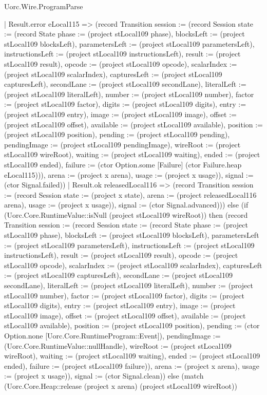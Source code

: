 \begin{lexlean}{Uorc.Wire.ProgramParse}
\begin{semanticmodule}
{      | Result.error eLocal115 => (record Transition {session := (record Session {state := (record State {phase := (project stLocal109 phase), blocksLeft := (project stLocal109 blocksLeft), parametersLeft := (project stLocal109 parametersLeft), instructionsLeft := (project stLocal109 instructionsLeft), result := (project stLocal109 result), opcode := (project stLocal109 opcode), scalarIndex := (project stLocal109 scalarIndex), capturesLeft := (project stLocal109 capturesLeft), secondLane := (project stLocal109 secondLane), literalLeft := (project stLocal109 literalLeft), number := (project stLocal109 number), factor := (project stLocal109 factor), digits := (project stLocal109 digits), entry := (project stLocal109 entry), image := (project stLocal109 image), offset := (project stLocal109 offset), available := (project stLocal109 available), position := (project stLocal109 position), pending := (project stLocal109 pending), pendingImage := (project stLocal109 pendingImage), wireRoot := (project stLocal109 wireRoot), waiting := (project stLocal109 waiting), ended := (project stLocal109 ended), failure := (ctor Option.some [Failure] (ctor Failure.heap eLocal115))}), arena := (project x arena), usage := (project x usage)}), signal := (ctor Signal.failed)})
      | Result.ok releasedLocal116 => (record Transition {session := (record Session {state := (project x state), arena := (project releasedLocal116 arena), usage := (project x usage)}), signal := (ctor Signal.advanced)})) else (if (Uorc.Core.RuntimeValue::isNull (project stLocal109 wireRoot)) then (record Transition {session := (record Session {state := (record State {phase := (project stLocal109 phase), blocksLeft := (project stLocal109 blocksLeft), parametersLeft := (project stLocal109 parametersLeft), instructionsLeft := (project stLocal109 instructionsLeft), result := (project stLocal109 result), opcode := (project stLocal109 opcode), scalarIndex := (project stLocal109 scalarIndex), capturesLeft := (project stLocal109 capturesLeft), secondLane := (project stLocal109 secondLane), literalLeft := (project stLocal109 literalLeft), number := (project stLocal109 number), factor := (project stLocal109 factor), digits := (project stLocal109 digits), entry := (project stLocal109 entry), image := (project stLocal109 image), offset := (project stLocal109 offset), available := (project stLocal109 available), position := (project stLocal109 position), pending := (ctor Option.none [Uorc.Core.RuntimeProgram::Event]), pendingImage := (Uorc.Core.RuntimeValue::nullHandle), wireRoot := (project stLocal109 wireRoot), waiting := (project stLocal109 waiting), ended := (project stLocal109 ended), failure := (project stLocal109 failure)}), arena := (project x arena), usage := (project x usage)}), signal := (ctor Signal.clean)}) else (match (Uorc.Core.Heap::release (project x arena) (project stLocal109 wireRoot))
}
\end{semanticmodule}
\end{lexlean}
